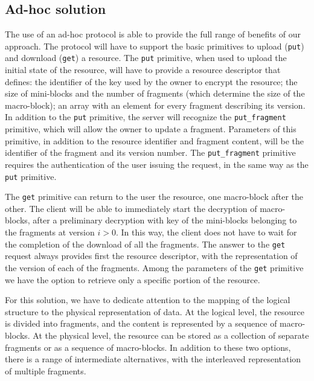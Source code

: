\subsection{Ad-hoc solution \label{ms:sec:adhoc}}
The use of an ad-hoc protocol is able to provide the full range of benefits of our approach. The protocol will have to support the basic primitives to upload ({\tt put}) and download ({\tt get}) a resource. The {\tt put} primitive, when used to upload the initial state of the resource, will have to provide a resource descriptor that defines: the identifier of the key  used by the owner to encrypt the resource; the size of mini-blocks and the number of fragments (which determine the size of the macro-block); an array with an element for every fragment describing its version. In addition to the {\tt put} primitive, the server will recognize the {\tt put\_fragment} primitive, which will allow the owner to update a fragment. Parameters of this primitive, in addition to the resource identifier and fragment content, will be the identifier of the fragment and its version number. The {\tt put\_fragment} primitive requires the authentication of the user issuing the request, in the same way as the {\tt put} primitive.

The {\tt get} primitive can return to the user the resource, one macro-block after the other. The client will be able to immediately start the decryption of macro-blocks, after a preliminary decryption with key  of the mini-blocks belonging to the fragments at version $i>0$. In this way, the client does not have to wait for the completion of the download of all the fragments. The answer to the {\tt get} request always provides first the resource descriptor, with the representation of the version of each of the fragments. Among the parameters of the {\tt get} primitive we have the option to retrieve only a specific portion of the resource.

For this solution, we have to dedicate attention to the mapping of the logical structure to the physical representation of data. At the logical level, the resource is divided into fragments, and the content is represented by a sequence of macro-blocks. At the physical level, the resource can be stored as a collection of separate fragments or as a sequence of macro-blocks. In addition to these two options, there is a range of intermediate alternatives, with the interleaved representation of multiple fragments.

